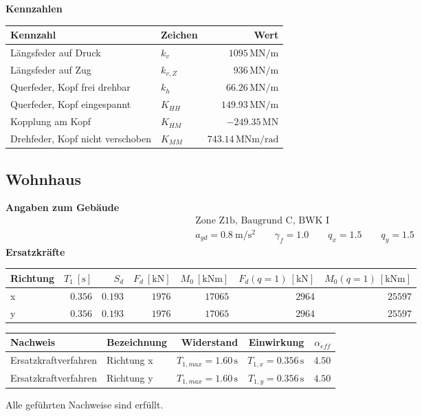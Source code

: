 \documentclass[11pt,a4paper]{article}
\begin{document}
\noindent\textbf{Kennzahlen}
\begin{longtable}{llr}
\hline
Kennzahl & Zeichen & Wert \\
\hline
\endhead
Längsfeder auf Druck & $k_v$ & $1095\,\mathrm{MN}/\mathrm{m}$ \\
Längsfeder auf Zug & $k_{v,Z}$ & $936\,\mathrm{MN}/\mathrm{m}$ \\
Querfeder, Kopf frei drehbar & $k_h$ & $66.26\,\mathrm{MN}/\mathrm{m}$ \\
Querfeder, Kopf eingespannt & $K_{HH}$ & $149.93\,\mathrm{MN}/\mathrm{m}$ \\
Kopplung am Kopf & $K_{HM}$ & $-249.35\,\mathrm{MN}$ \\
Drehfeder, Kopf nicht verschoben & $K_{MM}$ & $743.14\,\mathrm{MNm}/\mathrm{rad}$ \\
\hline
\end{longtable}
\subsection{Wohnhaus}
\noindent\textbf{Angaben zum Gebäude}
\begin{equation*}
\begin{aligned} & \text{Zone Z1b, Baugrund C, BWK I} \\ & a_{gd} = 0.8\ \mathrm{m/s^2} \qquad \gamma_f = 1.0 \qquad q_x = 1.5 \qquad q_y = 1.5 \end{aligned}
\end{equation*}
\noindent\textbf{Ersatzkräfte}
\begin{longtable}{lrrrrrr}
\hline
Richtung & $T_1\ [\mathrm{s}]$ & $S_d$ & $F_d\ [\mathrm{kN}]$ & $M_0\ [\mathrm{kNm}]$ & $F_d(q = 1)\ [\mathrm{kN}]$ & $M_0(q = 1)\ [\mathrm{kNm}]$ \\
\hline
\endhead
x & $0.356$ & $0.193$ & $1976$ & $17065$ & $2964$ & $25597$ \\
y & $0.356$ & $0.193$ & $1976$ & $17065$ & $2964$ & $25597$ \\
\hline
\end{longtable}
\begin{xltabular}{\linewidth}{>{\raggedright\arraybackslash}X>{\raggedright\arraybackslash}Xrrr}
\hline
Nachweis & Bezeichnung & Widerstand & Einwirkung & $\alpha_{eff}$ \\
\hline
\endhead
Ersatzkraftverfahren & Richtung x & $T_{1,max} = 1.60\,\mathrm{s}$ & $T_{1,x} = 0.356\,\mathrm{s}$ & $4.50$ \\
Ersatzkraftverfahren & Richtung y & $T_{1,max} = 1.60\,\mathrm{s}$ & $T_{1,y} = 0.356\,\mathrm{s}$ & $4.50$ \\
\hline
\end{xltabular}
Alle geführten Nachweise sind erfüllt.
\end{document}
